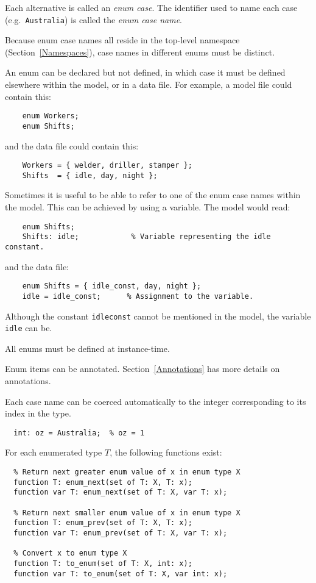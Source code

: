 \documentclass[10pt]{scrartcl}
\begin{document}
Each alternative is called an \emph{enum case}.  The identifier used to name
each case (e.g.~\texttt{Australia}) is
called the \emph{enum case name}.

Because enum case names all reside in the top-level namespace
(Section~\ref{Namespaces}), case names in different enums must be distinct.

An enum can be declared but not defined, in which case it must be defined
elsewhere within the model, or in a data file.
For example, a model file could contain this:
\begin{verbatim}
    enum Workers;
    enum Shifts;
\end{verbatim}
and the data file could contain this:
\begin{verbatim}
    Workers = { welder, driller, stamper };
    Shifts  = { idle, day, night };
\end{verbatim}
Sometimes it is useful to be able to refer to one of the enum case names
within the model.  This can be achieved by using a variable.  The model
would read:
\begin{verbatim}
    enum Shifts;
    Shifts: idle;            % Variable representing the idle constant.
\end{verbatim}
and the data file:
\begin{verbatim}
    enum Shifts = { idle_const, day, night };
    idle = idle_const;      % Assignment to the variable.
\end{verbatim}
Although the constant \texttt{idle\n{}const} cannot be mentioned in the
model, the variable \texttt{idle} can be.

All enums must be defined at instance-time.

Enum items can be annotated.
Section~\ref{Annotations} has more details on annotations.

Each case name can be coerced automatically to the integer corresponding to its index in the type.
\begin{verbatim}
  int: oz = Australia;  % oz = 1
\end{verbatim}

For each enumerated type $T$, the following functions exist:

\begin{verbatim}
  % Return next greater enum value of x in enum type X
  function T: enum_next(set of T: X, T: x);
  function var T: enum_next(set of T: X, var T: x);
  
  % Return next smaller enum value of x in enum type X
  function T: enum_prev(set of T: X, T: x);
  function var T: enum_prev(set of T: X, var T: x);

  % Convert x to enum type X
  function T: to_enum(set of T: X, int: x);
  function var T: to_enum(set of T: X, var int: x);
\end{verbatim}
\end{document}
